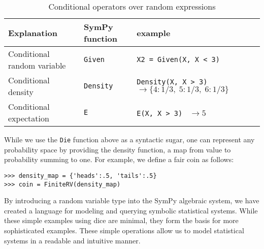 \begin{table}[h]
\begin{tabular}{|lll|}
\hline
Explanation & SymPy function & example\\ \hline
Conditional random variable & {\tt Given} & {\tt X2 = Given(X, X < 3)} \\ \hline
Conditional density & {\tt Density} & {\tt Density(X, X > 3) } $\rightarrow \{4: 1/3,\; 5: 1/3,\; 6: 1/3\}$ \\ \hline
Conditional expectation  & {\tt E} & {\tt E(X, X > 3) } $\rightarrow 5$ \\ \hline
\end{tabular}
\label{tab:cond_ops}
\caption{Conditional operators over random expressions}
\end{table}

While we use the {\tt Die} function above as a syntactic sugar, one can
represent any probability space by providing the density function, a map
from value to probability summing to one. For example, we define a fair coin as follows:
\begin{lstlisting}
>>> density_map = {'heads':.5, 'tails':.5}
>>> coin = FiniteRV(density_map)
\end{lstlisting}

By introducing a random variable type into the SymPy algebraic system, we have
created a language for modeling and querying symbolic statistical systems.
While these simple examples using dice are minimal, they form the basis for more
sophisticated examples.  These simple operations allow us to model statistical
systems in a readable and intuitive manner.
